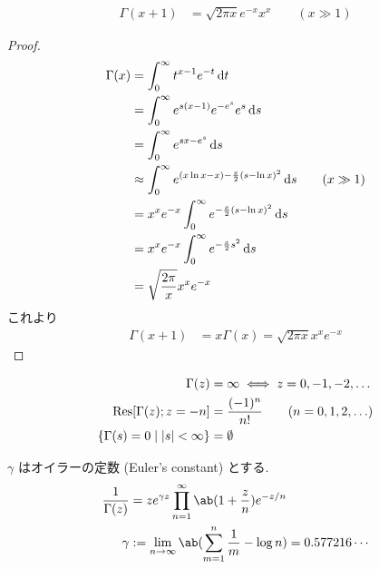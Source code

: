 \documentclass[uplatex,diffipdfmx,a4paper,11pt]{jlreq}
\begin{document}
\begin{proposition}
  \begin{align}
    \Gamma(x + 1) & = \sqrt{2\pi x}e^{-x}x^x \qquad (x \gg 1)
  \end{align}
\end{proposition}
\begin{proof}
  \begin{align}
    \Gamma(x) & = \int_0^\infty t^{x - 1}e^{-t}\dl{t}                                                    \\
              & = \int_0^\infty e^{s(x - 1)}e^{-e^s}e^s\dl{s}                                            \\
              & = \int_0^\infty e^{sx - e^s}\dl{s}                                                       \\
              & \approx \int_0^\infty e^{(x\ln x - x) - \frac{x}{2}(s - \ln x)^2}\dl{s} \qquad (x \gg 1) \\
              & = x^xe^{-x}\int_0^\infty e^{-\frac{x}{2}(s - \ln x)^2}\dl{s}                             \\
              & = x^xe^{-x}\int_0^\infty e^{-\frac{x}{2}s^2}\dl{s}                                       \\
              & = \sqrt{\frac{2\pi}{x}}x^xe^{-x}
  \end{align}
  これより
  \begin{align}
    \Gamma(x + 1) & = x\Gamma(x) = \sqrt{2\pi x}x^xe^{-x}
  \end{align}
\end{proof}

\begin{proposition}[ガンマ関数の極と零点]
  \begin{align}
    \Gamma(z)                                    & = \infty \iff z = 0, -1, -2, \ldots           \\
    \operatorname{Res}[\Gamma(z); z = -n]                      & = \frac{(-1)^n}{n!} \qquad (n = 0,1,2,\ldots) \\
    \lbrace\Gamma(s) = 0\mid |s| < \infty\rbrace & = \emptyset
  \end{align}
\end{proposition}

\begin{proposition}
  $\gamma$ はオイラーの定数 (Euler's constant) とする.
  \begin{align}
    \frac{1}{\Gamma(z)} & = ze^{\gamma z}\prod_{n=1}^{\infty}\ab(1 + \frac{z}{n})e^{-z/n}              \\
    \gamma              & := \lim_{n\to\infty}\ab(\sum_{m=1}^{n}\frac{1}{m} - \log n) = 0.577216\cdots
  \end{align}
\end{proposition}
\end{document}

